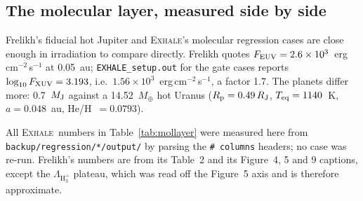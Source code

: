 \documentclass[english,a4paper]{my_memo}
\newcommand{\Rp}{R_{\rm p}}
\newcommand{\EXHALE}{\textsc{Exhale}}
\newcommand{\Hth}{\ensuremath{\mathrm{H}_3^+}}
\begin{document}
\subsection{The molecular layer, measured side by side}
\label{sec:mollayer}

Frelikh's fiducial hot Jupiter and \EXHALE's molecular regression cases are
close enough in irradiation to compare directly. Frelikh quotes
$F_{\rm EUV} = 2.6\times10^3$~erg\,cm$^{-2}$\,s$^{-1}$ at 0.05~au;
\texttt{EXHALE\_setup.out} for the gate cases reports
$\log_{10}F_{\rm XUV} = 3.193$, i.e.\
$1.56\times10^3$~erg\,cm$^{-2}$\,s$^{-1}$, a factor 1.7. The planets differ
more: 0.7~$M_{\rm J}$ against a 14.52~$M_\oplus$ hot Uranus
($\Rp = 0.49\,R_{\rm J}$, $T_{\rm eq} = 1140$~K, $a = 0.048$~au,
He/H~$= 0.0793$).

All \EXHALE\ numbers in Table~\ref{tab:mollayer} were measured here from
\texttt{backup/regression/*/output/} by parsing the \texttt{\# columns}
headers; no case was re-run. Frelikh's numbers are from its Table~2 and its
Figure~4, 5 and 9 captions, except the $\Lambda_{\Hth}$ plateau, which was
read off the Figure~5 axis and is therefore approximate.
\end{document}
